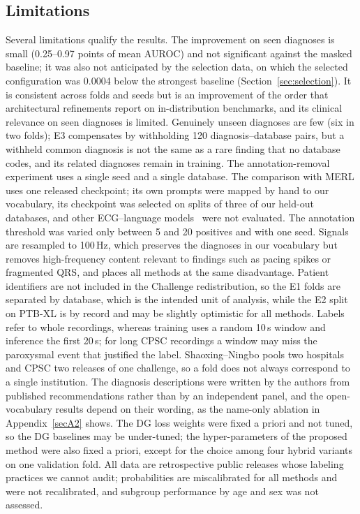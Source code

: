 \subsection{Limitations}\label{sec:limitations}
Several limitations qualify the results. The improvement on seen diagnoses is small (0.25--0.97 points of mean AUROC) and not significant against the masked baseline; it was also not anticipated by the selection data, on which the selected configuration was 0.0004 below the strongest baseline (Section~\ref{sec:selection}). It is consistent across folds and seeds but is an improvement of the order that architectural refinements report on in-distribution benchmarks, and its clinical relevance on seen diagnoses is limited. Genuinely unseen diagnoses are few (six in two folds); E3 compensates by withholding 120 diagnosis--database pairs, but a withheld common diagnosis is not the same as a rare finding that no database codes, and its related diagnoses remain in training. The annotation-removal experiment uses a single seed and a single database. The comparison with MERL uses one released checkpoint; its own prompts were mapped by hand to our vocabulary, its checkpoint was selected on splits of three of our held-out databases, and other ECG--language models~\cite{suprime2025,melp2025} were not evaluated. The annotation threshold was varied only between 5 and 20 positives and with one seed. Signals are resampled to 100\,Hz, which preserves the diagnoses in our vocabulary but removes high-frequency content relevant to findings such as pacing spikes or fragmented QRS, and places all methods at the same disadvantage. Patient identifiers are not included in the Challenge redistribution, so the E1 folds are separated by database, which is the intended unit of analysis, while the E2 split on PTB-XL is by record and may be slightly optimistic for all methods. Labels refer to whole recordings, whereas training uses a random 10\,s window and inference the first 20\,s; for long CPSC recordings a window may miss the paroxysmal event that justified the label. Shaoxing--Ningbo pools two hospitals and CPSC two releases of one challenge, so a fold does not always correspond to a single institution. The diagnosis descriptions were written by the authors from published recommendations rather than by an independent panel, and the open-vocabulary results depend on their wording, as the name-only ablation in Appendix~\ref{secA2} shows. The DG loss weights were fixed a priori and not tuned, so the DG baselines may be under-tuned; the hyper-parameters of the proposed method were also fixed a priori, except for the choice among four hybrid variants on one validation fold. All data are retrospective public releases whose labeling practices we cannot audit; probabilities are miscalibrated for all methods and were not recalibrated, and subgroup performance by age and sex was not assessed.

